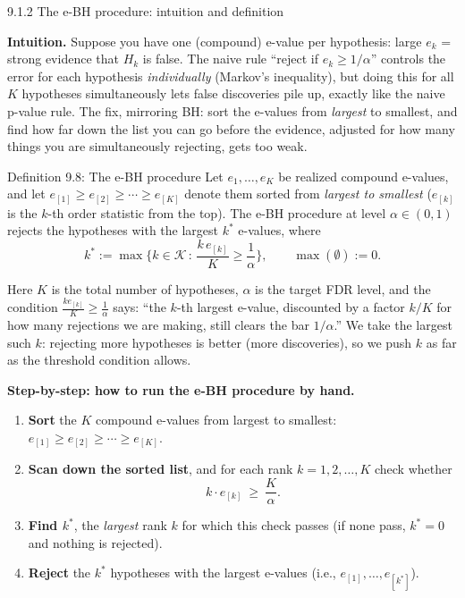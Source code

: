 \documentclass[aspectratio=169,10pt]{beamer}
\newcommand{\Kc}{\mathcal{K}}
\begin{document}
\begin{frame}[allowframebreaks]{9.1.2 The e-BH procedure: intuition and definition}

\textbf{Intuition.} Suppose you have one (compound) e-value per hypothesis: large $e_k$ = strong evidence that $H_k$ is false. The naive rule ``reject if $e_k \ge 1/\alpha$'' controls the error for each hypothesis \emph{individually} (Markov's inequality), but doing this for all $K$ hypotheses simultaneously lets false discoveries pile up, exactly like the naive p-value rule. The fix, mirroring BH: sort the e-values from \emph{largest} to smallest, and find how far down the list you can go before the evidence, adjusted for how many things you are simultaneously rejecting, gets too weak.

\begin{block}{Definition 9.8: The e-BH procedure}
Let $e_1,\dots,e_K$ be realized compound e-values, and let $e_{[1]} \ge e_{[2]} \ge \cdots \ge e_{[K]}$ denote them sorted from \emph{largest to smallest} ($e_{[k]}$ is the $k$-th order statistic from the top). The e-BH procedure at level $\alpha \in (0,1)$ rejects the hypotheses with the largest $k^\ast$ e-values, where
\[
k^\ast := \max\Big\{ k \in \Kc \,:\, \frac{k\, e_{[k]}}{K} \ge \frac{1}{\alpha} \Big\}, \qquad \max(\emptyset) := 0.
\]
\end{block}
Here $K$ is the total number of hypotheses, $\alpha$ is the target FDR level, and the condition $\frac{k e_{[k]}}{K}\ge\frac1\alpha$ says: ``the $k$-th largest e-value, discounted by a factor $k/K$ for how many rejections we are making, still clears the bar $1/\alpha$.'' We take the largest such $k$: rejecting more hypotheses is better (more discoveries), so we push $k$ as far as the threshold condition allows.

\framebreak

\textbf{Step-by-step: how to run the e-BH procedure by hand.}
\begin{enumerate}
\item \textbf{Sort} the $K$ compound e-values from largest to smallest: $e_{[1]} \ge e_{[2]} \ge \cdots \ge e_{[K]}$.
\item \textbf{Scan down the sorted list}, and for each rank $k=1,2,\dots,K$ check whether
\[
k \cdot e_{[k]} \ \ge\ \frac{K}{\alpha}.
\]
\item \textbf{Find $k^\ast$}, the \emph{largest} rank $k$ for which this check passes (if none pass, $k^\ast=0$ and nothing is rejected).
\item \textbf{Reject} the $k^\ast$ hypotheses with the largest e-values (i.e., $e_{[1]},\dots,e_{[k^\ast]}$).
\end{enumerate}


\end{frame}
\end{document}
